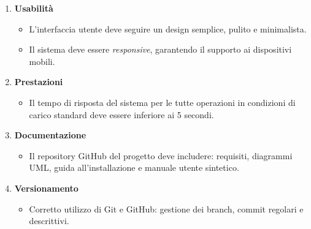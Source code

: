 \begin{enumerate}[label=\textbf{RNF\arabic*}, widest=RNF8, leftmargin=*, align=left]
    \item \textbf{Usabilità}
        \begin{itemize}[nosep, leftmargin=0cm]
            \item L'interfaccia utente deve seguire un design semplice, pulito e minimalista.
            \item Il sistema deve essere \textit{responsive}, garantendo il supporto ai dispositivi mobili.
        \end{itemize}

    \item \textbf{Prestazioni}
        \begin{itemize}[nosep, leftmargin=0cm]
            \item Il tempo di risposta del sistema per le tutte operazioni in condizioni di carico standard deve essere inferiore ai 5 secondi.
        \end{itemize}

    \item \textbf{Documentazione}
        \begin{itemize}[nosep, leftmargin=0cm]
            \item Il repository GitHub del progetto deve includere: requisiti, diagrammi UML, guida all'installazione e manuale utente sintetico.
        \end{itemize}

    \item \textbf{Versionamento}
        \begin{itemize}[nosep, leftmargin=0cm]
            \item Corretto utilizzo di Git e GitHub: gestione dei branch, commit regolari e descrittivi.
        \end{itemize}
\end{enumerate}
